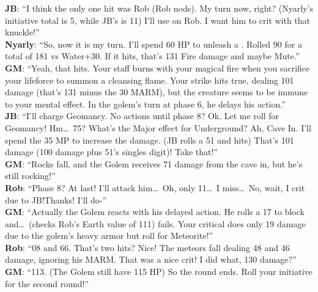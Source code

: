 \begin{multimog}
\textbf{JB}: \enquote{I think the only one hit was Rob (Rob nods). My turn now, right? (Nyarly's initiative total is 5, while JB's is 11) I'll use  on Rob. I want him to crit with that knuckle!} \\
\textbf{Nyarly}: \enquote{So, now it is my turn. I'll spend 60 HP to unleash a . Rolled 90 for a total of 181 vs Water+30. If it hits, that's 131 Fire damage and maybe Mute.} \\
\textbf{GM}: \enquote{Yeah, that hits. Your staff burns with your magical fire when you sacrifice your lifeforce to summon a cleansing flame. Your strike hits true, dealing 101 damage (that's 131 minus the 30 MARM), but the creature seems to be immune to your mental effect. In the golem's turn at phase 6, he delays his action.} \\
\textbf{JB}: \enquote{I'll charge Geomancy. No actions until phase 8? Ok. Let me roll for Geomancy! Hm\ldots{}\ 75? What’s the Major effect for Underground? Ah, Cave In. I'll spend the 35 MP to increase the damage. (JB rolls a 51 and hits) That's 101 damage (100 damage plus 51's singles digit)! Take that!} \\
\textbf{GM}: \enquote{Rocks fall, and the Golem receives 71 damage from the cave in, but he's still rocking!} \\
\textbf{Rob}: \enquote{Phase 8? At last! I'll attack him\ldots{}\ Oh, only 11\ldots{}\ I miss\ldots{}\ No, wait, I crit due to JB!\@{}Thanks! I'll do-} \\
\textbf{GM}: \enquote{Actually the Golem reacts with his delayed action. He rolls a 17 to block and\ldots{}\ (checks Rob's Earth value of 111) fails. Your critical does only 19 damage due to the golem's heavy armor but roll for Meteorite!} \\
\textbf{Rob}: \enquote{08 and 66. That's two hits? Nice! The meteors fall dealing 48 and 46 damage, ignoring his MARM\@. That was a nice crit! I did what, 130 damage?} \\
\textbf{GM}: \enquote{113. (The Golem still have 115 HP) So the round ends. Roll your initiative for the second round!} \\ 
\end{multimog}

